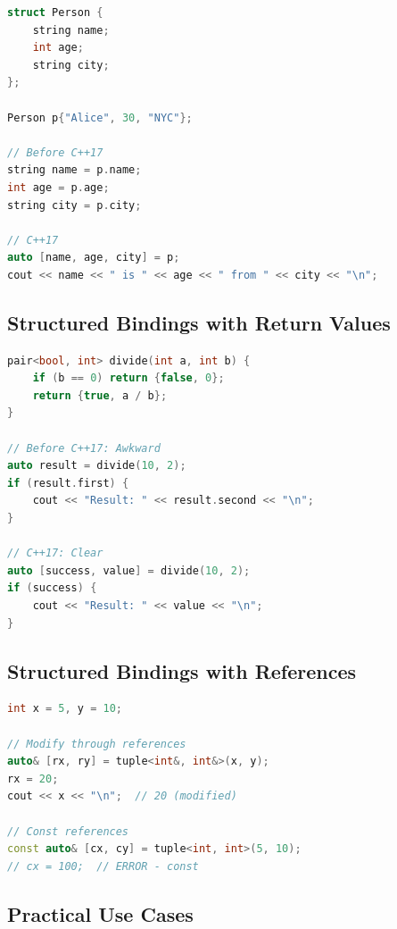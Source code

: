 \begin{lstlisting}[language={C++}]
struct Person {
    string name;
    int age;
    string city;
};

Person p{"Alice", 30, "NYC"};

// Before C++17
string name = p.name;
int age = p.age;
string city = p.city;

// C++17
auto [name, age, city] = p;
cout << name << " is " << age << " from " << city << "\n";
\end{lstlisting}

\hypertarget{structured-bindings-with-return-values}{%
\subsection{Structured Bindings with Return
Values}\label{structured-bindings-with-return-values}}

\begin{lstlisting}[language={C++}]
pair<bool, int> divide(int a, int b) {
    if (b == 0) return {false, 0};
    return {true, a / b};
}

// Before C++17: Awkward
auto result = divide(10, 2);
if (result.first) {
    cout << "Result: " << result.second << "\n";
}

// C++17: Clear
auto [success, value] = divide(10, 2);
if (success) {
    cout << "Result: " << value << "\n";
}
\end{lstlisting}

\hypertarget{structured-bindings-with-references}{%
\subsection{Structured Bindings with
References}\label{structured-bindings-with-references}}

\begin{lstlisting}[language={C++}]
int x = 5, y = 10;

// Modify through references
auto& [rx, ry] = tuple<int&, int&>(x, y);
rx = 20;
cout << x << "\n";  // 20 (modified)

// Const references
const auto& [cx, cy] = tuple<int, int>(5, 10);
// cx = 100;  // ERROR - const
\end{lstlisting}

\hypertarget{practical-use-cases}{%
\subsection{Practical Use Cases}\label{practical-use-cases}}

